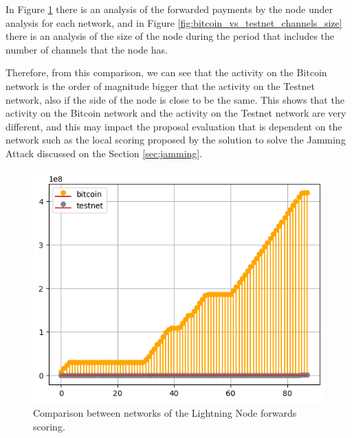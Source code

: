 In Figure \ref{fig:bitcoin_vs_testnet_forwards} there is an analysis of the forwarded payments by 
the node under analysis for each network, and in Figure \ref{fig:bitcoin_vs_testnet_channels_size} there is an 
analysis of the size of the node during the period that includes the number of channels that the node 
has.

Therefore, from this comparison, we can see that the activity on the Bitcoin network 
is the order of magnitude bigger that the activity on the Testnet network, also if the 
side of the node is close to be the same. This shows that the activity on the Bitcoin network and 
the activity on the Testnet network are very different, and this may impact the proposal evaluation 
that is dependent on the network such as the local scoring proposed by the solution to solve 
the Jamming Attack discussed on the Section \ref{sec:jamming}.

\begin{figure}[H]
    \begin{center}
        \includegraphics[scale=0.7]{imgs/bitcoin_vs_testnet_forwards.png}
    \end{center}
    \caption{Comparison between networks of the Lightning Node forwards scoring.}
    \label{fig:bitcoin_vs_testnet_forwards}
\end{figure}

